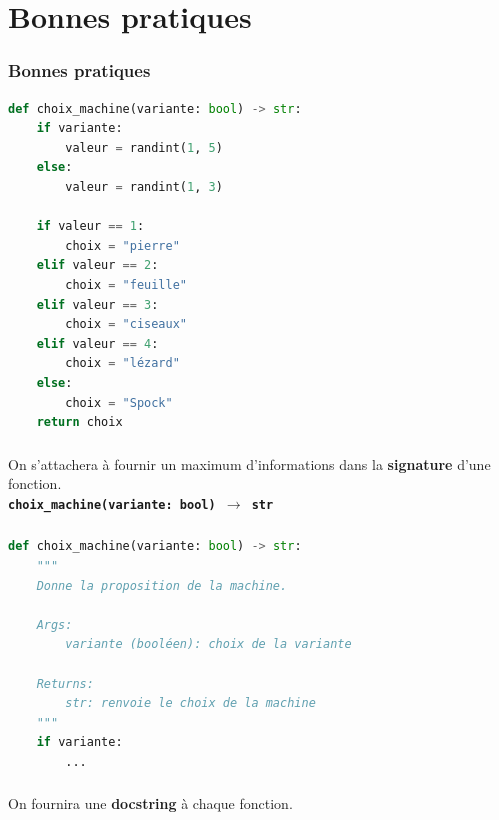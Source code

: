 \documentclass[svgnames,11pt]{beamer}
\begin{document}
\section{Bonnes pratiques}
\begin{frame}[fragile]
    \frametitle{Bonnes pratiques}

\begin{center}
    \begin{lstlisting}[language=Python , basicstyle=\ttfamily\small, xleftmargin=2em, xrightmargin=2em]
def choix_machine(variante: bool) -> str:
    if variante:
        valeur = randint(1, 5)        
    else:
        valeur = randint(1, 3)
        
    if valeur == 1:
        choix = "pierre"
    elif valeur == 2:
        choix = "feuille"
    elif valeur == 3:
        choix = "ciseaux"
    elif valeur == 4:
        choix = "lézard"
    else:
        choix = "Spock"
    return choix
\end{lstlisting}    
\end{center}
\end{frame}
\begin{frame}
    \frametitle{}

    \begin{aretenir}[]
    On s'attachera à fournir un maximum d'informations dans la \textbf{signature} d'une fonction.
    \\ \centering \textbf{\texttt{choix\_machine(variante: bool) $\rightarrow$ str}}
    \end{aretenir}

\end{frame}
\begin{frame}[fragile]
    \frametitle{}

    \begin{center}
        \begin{lstlisting}[language=Python , basicstyle=\ttfamily\small, xleftmargin=2em, xrightmargin=2em]
def choix_machine(variante: bool) -> str:
    """
    Donne la proposition de la machine.

    Args:
        variante (booléen): choix de la variante

    Returns:
        str: renvoie le choix de la machine
    """
    if variante:
        ...
\end{lstlisting}    
    \end{center}   

\end{frame}
\begin{frame}
    \frametitle{}

\begin{aretenir}[]
\centering On fournira une \textbf{docstring} à chaque fonction.
\end{aretenir}

\end{frame}
\end{document}
